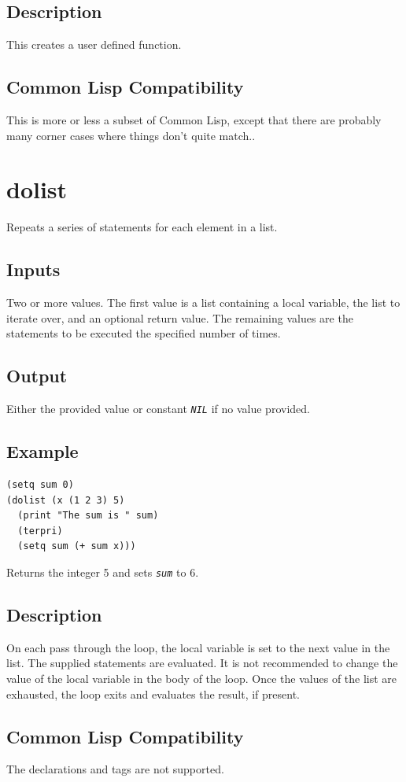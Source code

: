 \documentclass[10pt, openany]{book}
\newcommand{\constant}[1]{\emph{\texttt{#1}}}
\newcommand{\cl}{Common Lisp}
\begin{document}
\subsection{Description}
This creates a user defined function.
\subsection{Common Lisp Compatibility}
This is more or less a subset of \cl, except that there are probably many corner cases where things don't quite match..

\section{dolist}
Repeats a series of statements for each element in a list.
\subsection{Inputs}
Two or more values.  The first value is a list containing a local variable, the list to iterate over, and an optional return value.   The remaining values are the statements to be executed the specified number of times.
\subsection{Output}
Either the provided value or constant \constant{NIL} if no value provided.
\subsection{Example}
\begin{lstlisting}
(setq sum 0)
(dolist (x (1 2 3) 5)
  (print "The sum is " sum)
  (terpri)
  (setq sum (+ sum x)))
\end{lstlisting}
Returns the integer 5 and sets \constant{sum} to 6.
\subsection{Description}
On each pass through the loop, the local variable is set to the next value in the list.  The supplied statements are evaluated.  It is not recommended to change the value of the local variable in the body of the loop.  Once the values of the list are exhausted, the loop exits and evaluates the result, if present.
\subsection{Common Lisp Compatibility}
The declarations and tags are not supported.
\end{document}
